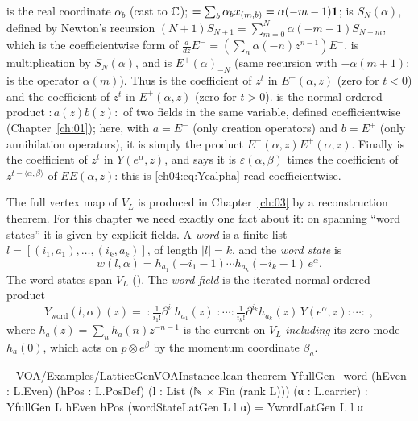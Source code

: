 \begin{dictionary}
 is the real coordinate $\alpha_b$ (cast to ${\mathbb{C}}$);
 $=\sum_b\alpha_b x_{(m,b)}=\alpha(-m-1)\mathbf{1}$;  is $S_N(\alpha)$,
defined by Newton's recursion $(N+1)S_{N+1}=\sum_{m=0}^{N}\alpha(-m-1)S_{N-m}$, which is the
coefficientwise form of $\tfrac{d}{dz}E^-=(\sum_n\alpha(-n)z^{n-1})E^-$.  is
multiplication by $S_N(\alpha)$, and  is $E^+(\alpha)_{-N}$ (same recursion with
$-\alpha(m+1)$;  is the operator $\alpha(m)$). Thus
 is the coefficient of $z^t$ in $E^-(\alpha,z)$ (zero for $t<0$) and
 the coefficient of $z^t$ in $E^+(\alpha,z)$ (zero for $t>0$).
 is the normal-ordered product $:\!a(z)b(z)\!:$ of two fields in the same variable,
defined coefficientwise (Chapter~\ref{ch:01}); here, with $a=E^-$ (only creation operators) and
$b=E^+$ (only annihilation operators), it is simply the product $E^-(\alpha,z)E^+(\alpha,z)$.
Finally  is the coefficient of $z^t$ in $Y(e^\alpha,z)$, and 
says it is $\varepsilon(\alpha,\beta)$ times the coefficient of $z^{t-\langle\alpha,\beta\rangle}$ of
$EE(\alpha,z)$: this is \eqref{ch04:eq:Yealpha} read coefficientwise.
\end{dictionary}

The full vertex map  of $V_L$ is produced in Chapter~\ref{ch:03} by a
reconstruction theorem. For this chapter we need exactly one fact about it: on spanning ``word
states'' it is given by explicit fields. A \emph{word} is a finite list
$l=[(i_1,a_1),\dots,(i_k,a_k)]$, of length $|l|=k$, and the \emph{word state} is
\begin{equation*}
  w(l,\alpha)=h_{a_1}(-i_1-1)\cdots h_{a_k}(-i_k-1)\,e^\alpha .
\end{equation*}
The word states span $V_L$ (). The \emph{word field} is the iterated
normal-ordered product
\begin{equation*}
  Y_{\mathrm{word}}(l,\alpha)(z)
  =\;:\!\tfrac{1}{i_1!}\partial^{i_1}h_{a_1}(z)\;:\!\cdots
  :\!\tfrac{1}{i_k!}\partial^{i_k}h_{a_k}(z)\,Y(e^\alpha,z)\!:\cdots\!:\;,
\end{equation*}
where $h_a(z)=\sum_n h_a(n)z^{-n-1}$ is the current on $V_L$ \emph{including} its zero mode
$h_a(0)$, which acts on $p\otimes e^\beta$ by the momentum coordinate $\beta_a$.

\begin{leancode}
-- VOA/Examples/LatticeGenVOAInstance.lean
theorem YfullGen_word (hEven : L.Even) (hPos : L.PosDef) (l : List (ℕ × Fin (rank L)))
    (α : L.carrier) :
    YfullGen L hEven hPos (wordStateLatGen L l α) = YwordLatGen L l α
\end{leancode}

